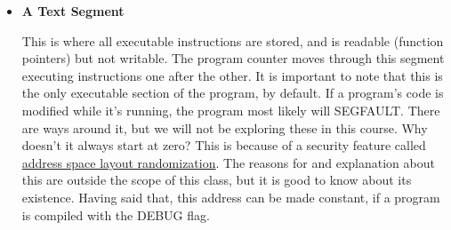 \begin{itemize}
\begin{itemize}
          This section is writable \cite[P. 124]{van1994expert}.
          Most notably, this section contains variables that were initialized with a static initializer, as follows:

\begin{lstlisting}[language=C]
int global = 1;
\end{lstlisting}

    \item \textbf{Uninitialized Data Segment / BSS}
          BSS stands for an old assembler operator known as Block Started by Symbol.

          This contains all of your globals and any other static duration variables that are implicitly zeroed out.

          Example:
\begin{lstlisting}[language=C]
int assumed_to_be_zero;
\end{lstlisting}

          This variable will be zeroed; otherwise, we would have a security risk involving isolation from other processes.
          They get put in a different section to speed up process start up time.
          This section starts at the end of the data segment and is also static in size because the amount of globals is known at compile time.
          Currently, both the initialized and BSS data segments are combined and referred to as the data segment \cite[P. 124]{van1994expert}, despite being somewhat different in purpose.

\end{itemize}

\item \textbf{A Text Segment}

This is where all executable instructions are stored, and is readable (function pointers) but not writable.
The program counter moves through this segment executing instructions one after the other.
It is important to note that this is the only executable section of the program, by default.
If a program's code is modified while it's running, the program most likely will SEGFAULT.
There are ways around it, but we will not be exploring these in this course.
Why doesn't it always start at zero?
This is because of a security feature called \href{https://en.wikipedia.org/wiki/Address_space_layout_randomization}{address space layout randomization}.
The reasons for and explanation about this are outside the scope of this class, but it is good to know about its existence.
Having said that, this address can be made constant, if a program is compiled with the DEBUG flag.

\end{itemize}


